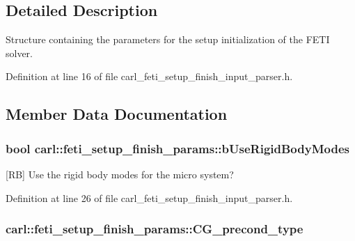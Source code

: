 \subsection{Detailed Description}
Structure containing the parameters for the setup initialization of the F\+E\+T\+I solver. 

Definition at line 16 of file carl\+\_\+feti\+\_\+setup\+\_\+finish\+\_\+input\+\_\+parser.\+h.



\subsection{Member Data Documentation}
\hypertarget{structcarl_1_1feti__setup__finish__params_a4226249254863225438b36c9c2f47615}{}
\subsubsection[{b\+Use\+Rigid\+Body\+Modes}]{\setlength{\rightskip}{0pt plus 5cm}bool carl\+::feti\+\_\+setup\+\_\+finish\+\_\+params\+::b\+Use\+Rigid\+Body\+Modes}\label{structcarl_1_1feti__setup__finish__params_a4226249254863225438b36c9c2f47615}


\mbox{[}R\+B\mbox{]} Use the rigid body modes for the micro system? 



Definition at line 26 of file carl\+\_\+feti\+\_\+setup\+\_\+finish\+\_\+input\+\_\+parser.\+h.

\hypertarget{structcarl_1_1feti__setup__finish__params_ad5b14913a3808cee9a058d7a90c4ee5e}{}
\subsubsection[{C\+G\+\_\+precond\+\_\+type}]{ carl\+::feti\+\_\+setup\+\_\+finish\+\_\+params\+::\+C\+G\+\_\+precond\+\_\+type}\label{structcarl_1_1feti__setup__finish__params_ad5b14913a3808cee9a058d7a90c4ee5e}


